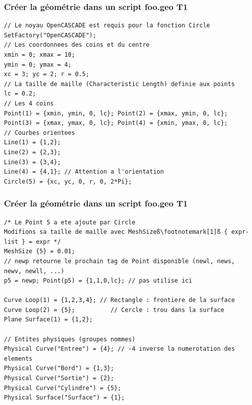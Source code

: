 \documentclass[aspectratio=169]{beamer}
\begin{document}
\begin{frame}[fragile]
\frametitle{Créer la géométrie dans un script foo.geo \hfill T1}
\begin{lstlisting}[frame=none,aboveskip=1mm]
// Le noyau OpenCASCADE est requis pour la fonction Circle
SetFactory("OpenCASCADE");
// Les coordonnees des coins et du centre
xmin = 0; xmax = 10;
ymin = 0; ymax = 4;
xc = 3; yc = 2; r = 0.5;
// La taille de maille (Characteristic Length) definie aux points
lc = 0.2;
// Les 4 coins
Point(1) = {xmin, ymin, 0, lc}; Point(2) = {xmax, ymin, 0, lc};
Point(3) = {xmax, ymax, 0, lc}; Point(4) = {xmin, ymax, 0, lc};
// Courbes orientees
Line(1) = {1,2};
Line(2) = {2,3};
Line(3) = {3,4};
Line(4) = {4,1}; // Attention a l'orientation
Circle(5) = {xc, yc, 0, r, 0, 2*Pi};
\end{lstlisting}
\end{frame}

\begin{frame}[fragile]
\frametitle{Créer la géométrie dans un script foo.geo \hfill T1}
\begin{lstlisting}[aboveskip=0.5mm,frame=none,escapechar=ß]
/* Le Point 5 a ete ajoute par Circle
Modifions sa taille de maille avec MeshSizeß\footnotemark[1]ß { expr-list } = expr */
MeshSize {5} = 0.01;
// newp retourne le prochain tag de Point disponible (newl, news, newv, newll, ...)
p5 = newp; Point(p5) = {1,1,0,lc}; // pas utilise ici

Curve Loop(1) = {1,2,3,4}; // Rectangle : frontiere de la surface
Curve Loop(2) = {5};          // Cercle : trou dans la surface
Plane Surface(1) = {1,2};

// Entites physiques (groupes nommes)
Physical Curve("Entree") = {4}; // -4 inverse la numerotation des elements
Physical Curve("Bord") = {1,3};
Physical Curve("Sortie") = {2};
Physical Curve("Cylindre") = {5};
Physical Surface("Surface") = {1};
\end{lstlisting}
\end{frame}
\end{document}
